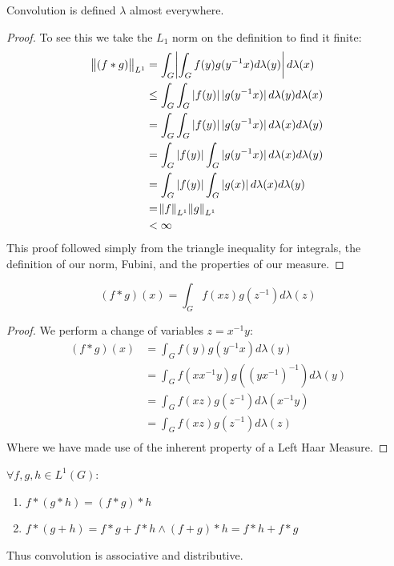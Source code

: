 \begin{lemma}
Convolution is defined $\lambda$ almost everywhere. 
\end{lemma}

\begin{proof}To see this we take the $L_1$ norm on the definition to find it finite:
\begin{align*}
 \norm{(f \ast g)}_{L^1} &= \int_G \abs{ \int_G f(y) g(y^{-1}x) d\lambda(y) } d\lambda(x) 
\\ 
&\leq \int_G \int_G \abs[0]{f(y)} \abs[0]{g(y^{-1}x)} d\lambda(y) d\lambda(x) \\
&=  \int_G \int_G \abs[0]{f(y)} \abs[0]{g(y^{-1}x)} d\lambda(x) d\lambda(y) \\
&=  \int_G \abs[0]{f(y)} \int_G  \abs[0]{g(y^{-1}x)} d\lambda(x) d\lambda(y) \\
&=  \int_G \abs[0]{f(y)} \int_G  \abs[0]{g(x)} d\lambda(x) d\lambda(y) \\
 &= \norm{f}_{L^1} \norm{g}_{L^1} \\
 &< \infty
\end{align*}
This proof followed simply from the triangle inequality for integrals, the definition of our norm, Fubini, and the properties of our measure.
\end{proof}

\begin{lemma}
\begin{equation*}
(f \ast g)(x) = \int_G f(xz)g(z^{-1}) d\lambda(z)
\end{equation*}
\end{lemma}

\begin{proof}
We perform a change of variables $z = x^{-1}y$:
\begin{align*}
(f \ast g)(x) &= \int_G f(y)g(y^{-1}x) d\lambda(y) \\
&= \int_G f(xx^{-1}y)g((yx^{-1})^{-1}) d\lambda(y) \\
&= \int_G f(xz)g(z^{-1}) d\lambda(x^{-1}y) \\
&= \int_G f(xz)g(z^{-1}) d\lambda(z) \\
\end{align*}
Where we have made use of the inherent property of a Left Haar Measure.
\end{proof}

\begin{proposition}

$\forall f,g,h \in L^1(G):$
\begin{enumerate}
\item
$f \ast (g \ast h) = (f \ast g) \ast h $
\item
$f \ast (g + h) = f \ast g + f \ast h \wedge (f+g) \ast h = f\ast h + f\ast g $
\end{enumerate}
Thus convolution is associative and distributive.
\end{proposition}

